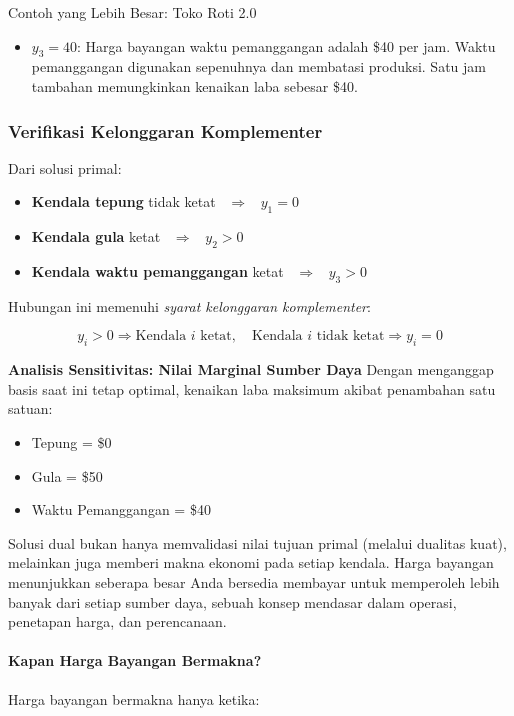 \begin{example}{Contoh yang Lebih Besar: Toko Roti 2.0}{}
\begin{itemize}
\item $y_3 = 40$: Harga bayangan waktu pemanggangan adalah \$40 per jam.
Waktu pemanggangan digunakan sepenuhnya dan membatasi produksi. Satu jam tambahan memungkinkan kenaikan laba sebesar \$40.
\end{itemize}

\vspace{1em}
\subsubsection*{Verifikasi Kelonggaran Komplementer}

Dari solusi primal:
\begin{itemize}
\item \textbf{Kendala tepung} tidak ketat \ $\Rightarrow$ \  $y_1 = 0$
\item \textbf{Kendala gula} ketat \ $\Rightarrow$ \ $y_2 > 0$
\item \textbf{Kendala waktu pemanggangan} ketat \ $\Rightarrow$ \ $y_3 > 0$
\end{itemize}

Hubungan ini memenuhi \emph{syarat kelonggaran komplementer}:

$$
y_i > 0 \Rightarrow \text{Kendala } i \text{ ketat}, \quad
\text{Kendala } i \text{ tidak ketat} \Rightarrow y_i = 0
$$

\vspace{1em}
\textbf{Analisis Sensitivitas: Nilai Marginal Sumber Daya}
Dengan menganggap basis saat ini tetap optimal, kenaikan laba maksimum akibat penambahan satu satuan:
\begin{itemize}
\item Tepung = \$0
\item Gula = \$50
\item Waktu Pemanggangan = \$40
\end{itemize}

\vspace{1em}

Solusi dual bukan hanya memvalidasi nilai tujuan primal (melalui dualitas kuat), melainkan juga memberi makna ekonomi pada setiap kendala. Harga bayangan menunjukkan seberapa besar Anda bersedia membayar untuk memperoleh lebih banyak dari setiap sumber daya, sebuah konsep mendasar dalam operasi, penetapan harga, dan perencanaan.

\paragraph{Kapan Harga Bayangan Bermakna?}
Harga bayangan bermakna hanya ketika:


\end{example}
